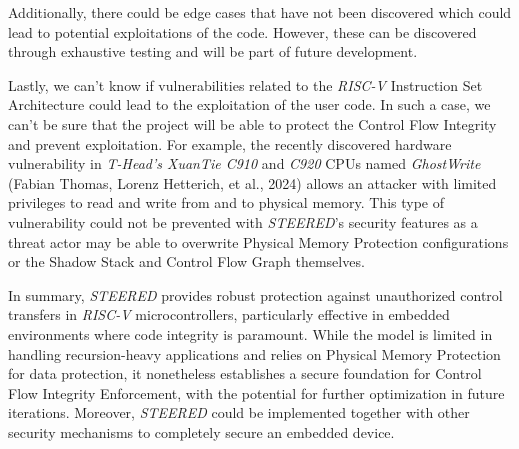 Additionally, there could be edge cases that have not been discovered which
could lead to potential exploitations of the code. However, these can be
discovered through exhaustive testing and will be part of future development.

Lastly, we can't know if vulnerabilities related to the \textit{RISC-V}
Instruction Set Architecture could lead to the exploitation of the user code. In
such a case, we can't be sure that the project will be able to protect the
Control Flow Integrity and prevent exploitation. For example, the recently
discovered hardware vulnerability in \textit{T-Head's XuanTie C910} and \textit{C920}
CPUs named \textit{GhostWrite}\cite{riscvuzz} (Fabian Thomas, Lorenz Hetterich, et
al., 2024) allows an attacker with limited privileges to read and write from and
to physical memory. This type of vulnerability could not be prevented with \textit{STEERED}'s
security features as a threat actor may be able to overwrite Physical Memory
Protection configurations or the Shadow Stack and Control Flow Graph themselves.

In summary, \textit{STEERED} provides robust protection against unauthorized
control transfers in \textit{RISC-V} microcontrollers, particularly effective in
embedded environments where code integrity is paramount. While the model is limited
in handling recursion-heavy applications and relies on Physical Memory Protection
for data protection, it nonetheless establishes a secure foundation for Control
Flow Integrity Enforcement, with the potential for further optimization in future
iterations. Moreover, \textit{STEERED} could be implemented together with other
security mechanisms to completely secure an embedded device.